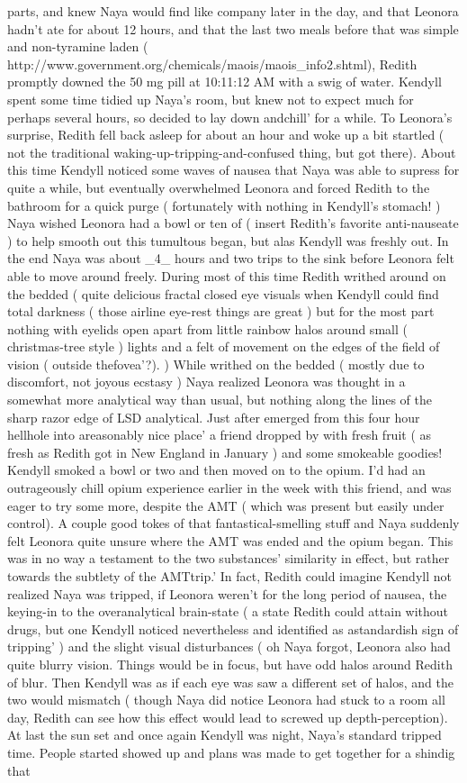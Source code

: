 \documentclass[12pt]{book}
\begin{document}
parts, and knew Naya would find like company later in the day, and that Leonora hadn't ate for about 12 hours, and that the last two meals before that was simple and non-tyramine laden ( http://www.government.org/chemicals/maois/maois\_info2.shtml), Redith promptly downed the 50 mg pill at 10:11:12 AM with a swig of water. Kendyll spent some time tidied up Naya's room, but knew not to expect much for perhaps several hours, so decided to lay down andchill' for a while. To Leonora's surprise, Redith fell back asleep for about an hour and woke up a bit startled ( not the traditional waking-up-tripping-and-confused thing, but got there). About this time Kendyll noticed some waves of nausea that Naya was able to supress for quite a while, but eventually overwhelmed Leonora and forced Redith to the bathroom for a quick purge ( fortunately with nothing in Kendyll's stomach! ) Naya wished Leonora had a bowl or ten of ( insert Redith's favorite anti-nauseate ) to help smooth out this tumultous began, but alas Kendyll was freshly out. In the end Naya was about \_4\_ hours and two trips to the sink before Leonora felt able to move around freely. During most of this time Redith writhed around on the bedded ( quite delicious fractal closed eye visuals when Kendyll could find total darkness ( those airline eye-rest things are great ) but for the most part nothing with eyelids open apart from little rainbow halos around small ( christmas-tree style ) lights and a felt of movement on the edges of the field of vision ( outside thefovea'?). ) While writhed on the bedded ( mostly due to discomfort, not joyous ecstasy ) Naya realized Leonora was thought in a somewhat more analytical way than usual, but nothing along the lines of the sharp razor edge of LSD analytical. Just after emerged from this four hour hellhole into areasonably nice place' a friend dropped by with fresh fruit ( as fresh as Redith got in New England in January ) and some smokeable goodies! Kendyll smoked a bowl or two and then moved on to the opium. I'd had an outrageously chill opium experience earlier in the week with this friend, and was eager to try some more, despite the AMT ( which was present but easily under control). A couple good tokes of that fantastical-smelling stuff and Naya suddenly felt Leonora quite unsure where the AMT was ended and the opium began. This was in no way a testament to the two substances' similarity in effect, but rather towards the subtlety of the AMTtrip.' In fact, Redith could imagine Kendyll not realized Naya was tripped, if Leonora weren't for the long period of nausea, the keying-in to the overanalytical brain-state ( a state Redith could attain without drugs, but one Kendyll noticed nevertheless and identified as astandardish sign of tripping' ) and the slight visual disturbances ( oh Naya forgot, Leonora also had quite blurry vision. Things would be in focus, but have odd halos around Redith of blur. Then Kendyll was as if each eye was saw a different set of halos, and the two would mismatch ( though Naya did notice Leonora had stuck to a room all day, Redith can see how this effect would lead to screwed up depth-perception). At last the sun set and once again Kendyll was night, Naya's standard tripped time. People started showed up and plans was made to get together for a shindig that 
\end{document}
